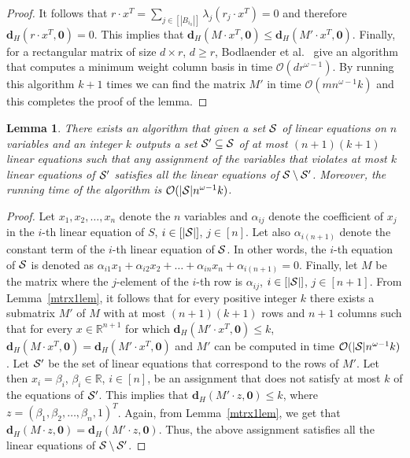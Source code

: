 \documentclass[a4paper,11pt]{article}
\newtheorem{lemma}{Lemma}
\newcommand{\Oh}{{\mathcal{O}}}
\newcommand{\hd}{\textbf{d}_{H}}
\begin{document}
\begin{proof}
It follows that 
$\displaystyle r\cdot x^{T}=\sum_{j\in [|B_{i_{0}}|]}\lambda_{j} (r_{j}\cdot x^{T})=0$ 
and therefore $\hd(r\cdot x^{T},\mathbf{0})=0$.
This implies that
$\hd(M\cdot x^{T},\mathbf{0})\leq\hd(M'\cdot x^{T},\mathbf{0}).$
Finally, for a rectangular matrix of size $d\times r$, $d\geq r$, Bodlaender et al.~\cite{BodlaenderCKN13} give an algorithm that computes a minimum weight column basis in
time $\Oh(dr^{\omega-1})$. By running this algorithm $k+1$ times we can find the matrix $M'$ in time $\Oh(mn^{\omega-1}k)$ and this completes the proof
of the lemma. 
\end{proof}

\begin{lemma}\label{mtrx2lem}
There exists an algorithm that given a set ${\cal S}$ of linear equations on $n$ variables and an integer $k$
outputs a set ${\cal S}'\subseteq {\cal S}$ of at most $(n+1)(k+1)$ linear equations such that any assignment of the variables that violates at most $k$ linear
equations of ${\cal S'}$ satisfies all the linear equations of ${\cal S}\setminus {\cal S'}$. Moreover, the running time of the algorithm is $\Oh(|{\cal S}| n^{\omega-1}k)$. 
\end{lemma}

\begin{proof}
Let $x_{1},x_{2},\dots,x_{n}$ denote the $n$ variables and $\alpha_{ij}$ denote the coefficient of $x_{j}$ in the $i$-th linear equation of $S$, $i\in [|{\cal S}|]$, $j\in [n]$. 
Let also $\alpha_{i(n+1)}$ denote the constant term of the $i$-th linear equation of ${\cal S}$. In other words, the $i$-th equation of ${\cal S}$ is denoted as
$\alpha_{i1}x_{1}+\alpha_{i2}x_{2}+\dots+\alpha_{in}x_{n}+\alpha_{i(n+1)}=0$.
Finally, let $M$ be the matrix where the $j$-element of the $i$-th row is 
$\alpha_{ij}$, $i\in [|{\cal S}|]$, $j\in [n+1]$. From Lemma~\ref{mtrx1lem}, it follows that
for every positive integer $k$ there exists a submatrix $M'$ of $M$ with at most $(n+1)(k+1)$ rows and $n+1$ columns such that for every 
$x\in \mathbb{R}^{n+1}$ for which $\hd(M'\cdot x^{T},\mathbf{0})\leq k$, $\hd(M\cdot x^{T},\mathbf{0})=\hd(M'\cdot x^{T},\mathbf{0})$ and
$M'$ can be computed in time $\Oh(|{\cal S}|n^{\omega -1}k)$. 
Let ${\cal S'}$ be the set of linear equations that correspond to the rows of $M'$. Let then $x_{i}=\beta_{i}$, 
$\beta_{i}\in \mathbb{R}$, $i\in [n]$, be an assignment that does not satisfy at most $k$ of the equations of ${\cal S'}$.
This implies that $\hd(M'\cdot z,\mathbf{0})\leq k$, where $z=(\beta_{1},\beta_{2},\dots,\beta_{n},1)^{T}$. Again, from Lemma~\ref{mtrx1lem}, 
we get that $\hd(M\cdot z,\mathbf{0})=\hd(M'\cdot z,\mathbf{0})$. Thus, the above assignment satisfies all the
linear equations of ${\cal S}\setminus {\cal S'}$.
\end{proof}
\end{document}
